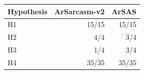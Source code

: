 \begin{tabular}{lrr}
\toprule
Hypothesis & ArSarcasm-v2 & ArSAS \\
\midrule
H1 & 15/15 & 15/15 \\
H2 & 4/4 & 3/4 \\
H3 & 1/4 & 3/4 \\
H4 & 35/35 & 35/35 \\
\bottomrule
\end{tabular}
